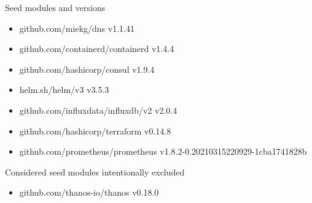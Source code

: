 \begin{table}[ht]
  \caption{Seed modules and versions}
  \label{table:seed}
  \begin{itemize}
  \item github.com/miekg/dns v1.1.41
  \item github.com/containerd/containerd v1.4.4
  \item github.com/hashicorp/consul v1.9.4
  \item helm.sh/helm/v3 v3.5.3
  \item github.com/influxdata/influxdb/v2 v2.0.4
  \item github.com/hashicorp/terraform v0.14.8

    \item github.com/prometheus/prometheus v1.8.2-0.20210315220929-1cba1741828b

  \end{itemize}
\end{table}

\begin{table}[ht]
  \caption{Considered seed modules intentionally excluded}
  \label{table:excluded}
  \begin{itemize}
  \item github.com/thanos-io/thanos v0.18.0
  \end{itemize}
\end{table}
